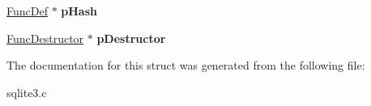 \begin{DoxyCompactItemize}
\item 
\hypertarget{struct_func_def_a04561444155a6922d6a2d99a29d35281}{\hyperlink{struct_func_def}{Func\-Def} $\ast$ {\bfseries p\-Hash}}\label{struct_func_def_a04561444155a6922d6a2d99a29d35281}

\item 
\hypertarget{struct_func_def_a1bd12675375b838b5c00b1c79c1e6301}{\hyperlink{struct_func_destructor}{Func\-Destructor} $\ast$ {\bfseries p\-Destructor}}\label{struct_func_def_a1bd12675375b838b5c00b1c79c1e6301}

\end{DoxyCompactItemize}


The documentation for this struct was generated from the following file\-:\begin{DoxyCompactItemize}
\item 
sqlite3.\-c\end{DoxyCompactItemize}
